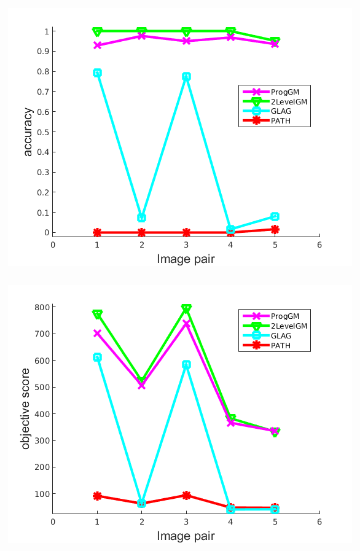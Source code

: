 \documentclass[hyperref={pdfpagelabels=false}]{beamer}
\begin{document}
\begin{frame}[allowframebreaks]
\begin{figure}[h] \centering
		\begin{subfigure}[b]{0.32\textwidth}
			\centering
			\includegraphics[scale=0.15]{"fig/evaluation/ImageTrafo/anchor_descr/using_cpd_afftrafo/performance/accuracy1"} 
		\end{subfigure} 
		\begin{subfigure}[b]{0.32\textwidth}
			\centering
			\includegraphics[scale=0.15]{"fig/evaluation/ImageTrafo/anchor_descr/using_cpd_afftrafo/performance/score1"} 
		\end{subfigure}
		\begin{subfigure}[b]{0.32\textwidth}
			\centering

\end{subfigure}
\end{figure}
\end{frame}
\end{document}
